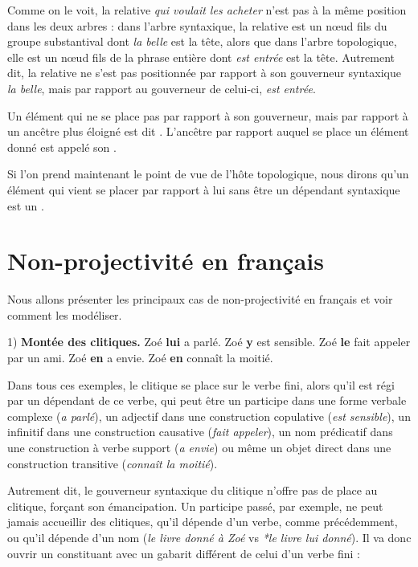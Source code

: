 Comme on le voit, la relative \textit{qui voulait les acheter} n’est pas à la même position dans les deux arbres : dans l’arbre syntaxique, la relative est un nœud fils du groupe substantival dont \textit{la belle} est la tête, alors que dans l’arbre topologique, elle est un nœud fils de la phrase entière dont \textit{est entrée} est la tête. Autrement dit, la relative ne s’est pas positionnée par rapport à son gouverneur syntaxique \textit{la belle}, mais par rapport au gouverneur de celui-ci, \textit{est entrée}.

\begin{styleLivreImportant}
Un élément qui ne se place pas par rapport à son gouverneur, mais par rapport à un ancêtre plus éloigné est dit . L’ancêtre par rapport auquel se place un élément donné est appelé son .
\end{styleLivreImportant}

Si l’on prend maintenant le point de vue de l’hôte topologique, nous dirons qu’un élément qui vient se placer par rapport à lui sans être un dépendant syntaxique est un .

\section{Non-projectivité en français}\label{sec:3.5.32}

Nous allons présenter les principaux cas de non-projectivité en français et voir comment les modéliser.

1) \textbf{Montée des clitiques.}
\ea
\ea
{Zoé} \textbf{{lui}}  {a parlé.}
\ex
 {Zoé} \textbf{{y}}  {est sensible.}
\ex
 {Zoé} \textbf{{le}}  {fait appeler par un ami.}
\ex
 {Zoé} \textbf{{en}}  {a envie.}
\ex
 {Zoé} \textbf{{en}}  {connaît la moitié.}
\z
\z

Dans tous ces exemples, le clitique se place sur le verbe fini, alors qu’il est régi par un dépendant de ce verbe, qui peut être un participe dans une forme verbale complexe (\textit{a parlé}), un adjectif dans une construction copulative (\textit{est sensible}), un infinitif dans une construction causative (\textit{fait appeler}), un nom prédicatif dans une construction à verbe support (\textit{a envie}) ou même un objet direct dans une construction transitive (\textit{connaît la moitié}).

Autrement dit, le gouverneur syntaxique du clitique n’offre pas de place au clitique, forçant son émancipation. Un participe passé, par exemple, ne peut jamais accueillir des clitiques, qu’il dépende d’un verbe, comme précédemment, ou qu’il dépende d’un nom (\textit{le livre donné à Zoé} vs \textit{*le livre lui donné}). Il va donc ouvrir un constituant avec un gabarit différent de celui d’un verbe fini :

